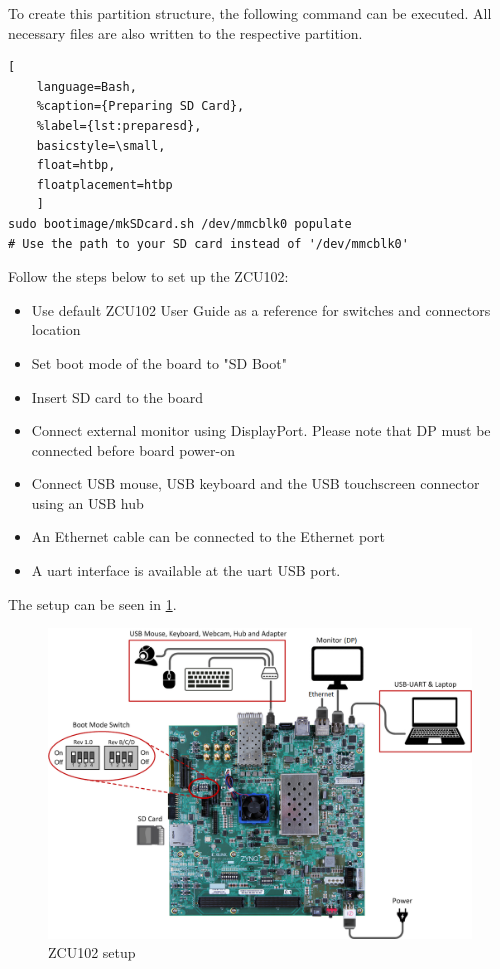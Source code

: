 To create this partition structure, the following command can be executed. All necessary files are also written to the respective partition.
\begin{lstlisting}[
	language=Bash,
	%caption={Preparing SD Card},
	%label={lst:preparesd},
	basicstyle=\small,
	float=htbp,
	floatplacement=htbp
	]
sudo bootimage/mkSDcard.sh /dev/mmcblk0 populate
# Use the path to your SD card instead of '/dev/mmcblk0'
\end{lstlisting}
\FloatBarrier

Follow the steps below to set up the ZCU102:
\begin{itemize}
    \item Use default ZCU102 User Guide \cite{UG1182} as a reference for switches and connectors location
    \item Set boot mode of the board to "SD Boot"
    \item Insert SD card to the board
    \item Connect external monitor using DisplayPort. Please note that DP must be connected before board power-on
    \item Connect USB mouse, USB keyboard and the USB touchscreen connector using an USB hub
    \item An Ethernet cable can be connected to the Ethernet port
    \item A \gls{uart} interface is available at the \gls{uart} USB port.
\end{itemize}

The setup can be seen in \cref{fig:zcu102setup}.

\begin{figure}[htbp]
    \centering
    \includegraphics[width=1\textwidth]{images/ZCU102.png}
    \caption{\label{fig:zcu102setup} ZCU102 setup}
\end{figure}

